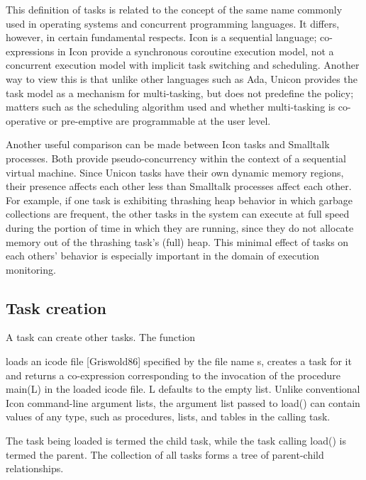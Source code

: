 This definition of tasks is related to the concept of the same name
commonly used in operating systems and concurrent programming
languages. It differs, however, in certain fundamental respects. Icon
is a sequential language; co-expressions in Icon provide a synchronous
coroutine execution model, not a concurrent execution model with
implicit task switching and scheduling. Another way to view this is
that unlike other languages such as Ada, Unicon provides the task model
as a mechanism for multi-tasking, but does not predefine the policy;
matters such as the scheduling algorithm used and whether multi-tasking
is co-operative or pre-emptive are programmable at the user
level.

Another useful comparison can be made between Icon tasks and Smalltalk
processes. Both provide pseudo-concurrency within the context of a
sequential virtual machine. Since Unicon tasks have their own dynamic
memory regions, their presence affects each other less than Smalltalk
processes affect each other. For example, if one task is exhibiting
thrashing heap behavior in which garbage collections are frequent, the
other tasks in the system can execute at full speed during the portion
of time in which they are running, since they do not allocate memory
out of the thrashing task's (full) heap. This minimal
effect of tasks on each others' behavior is especially
important in the domain of execution monitoring. 

\subsection{Task creation}

A task can create other tasks. The function 


\noindent loads an icode file [Griswold86] specified by the file name
\textrm{s}, creates a task for it and returns a co-expression corresponding to
the invocation of the procedure {\textrm{main(L)}} in the
loaded icode file.  {\textrm{L}}{
}defaults to the empty list. Unlike conventional Icon command-line argument
lists, the argument list passed to{
}{\textrm{load()}} can contain values of any type, such as
procedures, lists, and tables in the calling task.

The task being loaded is termed the child task, while the task calling
{\textrm{load()}} is termed the parent. The
collection of all tasks forms a tree of parent-child
relationships.

